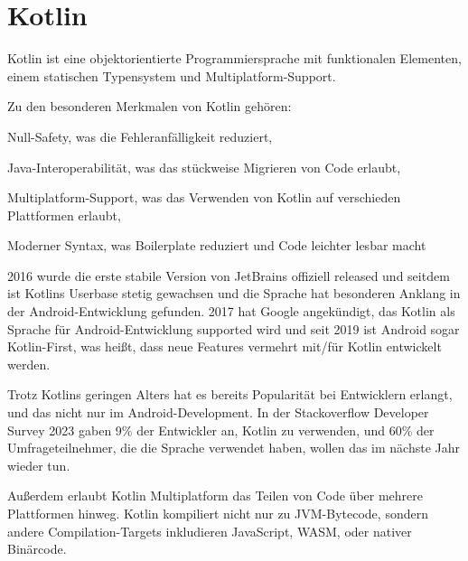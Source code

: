 
\chapter{Kotlin}\label{ch:kotlin}

Kotlin ist eine objektorientierte Programmiersprache mit funktionalen Elementen, einem statischen Typensystem und
Multiplatform-Support.

Zu den besonderen Merkmalen von Kotlin gehören:
\begin{liste}
    \item Null-Safety, was die Fehleranfälligkeit reduziert,
    \item Java-Interoperabilität, was das stückweise Migrieren von Code erlaubt,
    \item Multiplatform-Support, was das Verwenden von Kotlin auf verschieden Plattformen erlaubt,
    \item Moderner Syntax, was Boilerplate reduziert und Code leichter lesbar macht
\end{liste}

2016 wurde die erste stabile Version von JetBrains offiziell released und seitdem ist Kotlins Userbase
stetig gewachsen und die Sprache hat besonderen Anklang in der Android-Entwicklung gefunden.
2017 hat Google angekündigt, das Kotlin als Sprache für Android-Entwicklung supported wird und seit 2019 ist Android
sogar Kotlin-First, was heißt, dass neue Features vermehrt mit/für Kotlin entwickelt werden.

Trotz Kotlins geringen Alters hat es bereits Popularität bei Entwicklern erlangt, und das nicht nur im
Android-Development.
In der Stackoverflow Developer Survey 2023 gaben 9\% der Entwickler an, Kotlin zu verwenden, und 60\% der
Umfrageteilnehmer, die die Sprache verwendet haben, wollen das im nächste Jahr wieder tun.

Außerdem erlaubt Kotlin Multiplatform das Teilen von Code über mehrere Plattformen hinweg.
Kotlin kompiliert nicht nur zu JVM-Bytecode, sondern andere Compilation-Targets inkludieren JavaScript, WASM, oder
nativer Binärcode.








